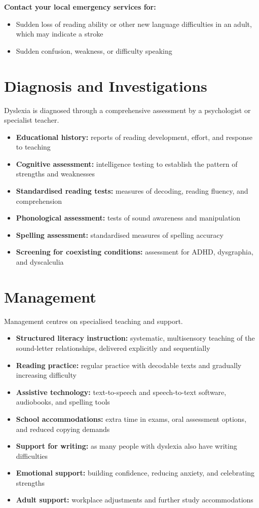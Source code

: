 \textbf{Contact your local emergency services for:}
\begin{itemize}
    \item Sudden loss of reading ability or other new language difficulties in an adult, which may indicate a stroke
    \item Sudden confusion, weakness, or difficulty speaking
\end{itemize}

\section*{Diagnosis and Investigations}
Dyslexia is diagnosed through a comprehensive assessment by a psychologist or specialist teacher.
\begin{itemize}
    \item \textbf{Educational history:} reports of reading development, effort, and response to teaching
    \item \textbf{Cognitive assessment:} intelligence testing to establish the pattern of strengths and weaknesses
    \item \textbf{Standardised reading tests:} measures of decoding, reading fluency, and comprehension
    \item \textbf{Phonological assessment:} tests of sound awareness and manipulation
    \item \textbf{Spelling assessment:} standardised measures of spelling accuracy
    \item \textbf{Screening for coexisting conditions:} assessment for ADHD, dysgraphia, and dyscalculia
\end{itemize}

\section*{Management}
Management centres on specialised teaching and support.
\begin{itemize}
    \item \textbf{Structured literacy instruction:} systematic, multisensory teaching of the sound-letter relationships, delivered explicitly and sequentially
    \item \textbf{Reading practice:} regular practice with decodable texts and gradually increasing difficulty
    \item \textbf{Assistive technology:} text-to-speech and speech-to-text software, audiobooks, and spelling tools
    \item \textbf{School accommodations:} extra time in exams, oral assessment options, and reduced copying demands
    \item \textbf{Support for writing:} as many people with dyslexia also have writing difficulties
    \item \textbf{Emotional support:} building confidence, reducing anxiety, and celebrating strengths
    \item \textbf{Adult support:} workplace adjustments and further study accommodations
\end{itemize}

